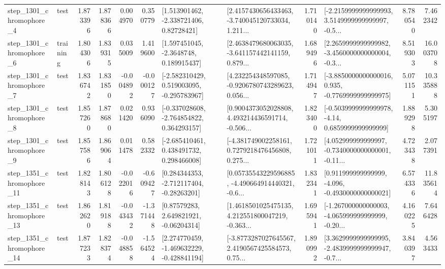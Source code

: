 \begin{tabular}{llrrrrllrlrr}
  step\_1301\_chromophore\_4 &      test &      1.873396 &    1.878366 &      0.004970 &  0.350779 &     [1.513901462, -2.338721406, 0.82728421] &  [2.4157430656433463, -3.740045120733034, 1.211... &       1.710140 &  [-2.2159999999999993, 3.5149999999999997, -0.5... &            8.780540 &          7.462342 \\
  step\_1301\_chromophore\_6 &  training &      1.804306 &    1.839315 &      0.035009 &  1.419600 &      [1.597451045, -2.3648748, 0.189915437] &  [2.4638479680063035, -3.641157442141159, 0.879... &       1.689496 &  [2.2659999999999982, -3.4560000000000004, -0.3... &            8.519303 &         16.003708 \\
  step\_1301\_chromophore\_7 &      test &      1.836742 &    1.831850 &     -0.004892 & -0.000127 &   [-2.582310429, 0.519003095, -0.295783967] &  [4.232254348597085, -0.9206780743289623, 0.056... &       1.714947 &  [-3.8850000000000016, 0.935, -0.7769999999999975] &            5.071151 &         10.335888 \\
  step\_1301\_chromophore\_8 &      test &      1.857260 &    1.878680 &      0.021420 &  0.936090 &   [-0.337028608, -2.764854822, 0.364293157] &  [0.9004373052028808, 4.493214436591714, -0.506... &       1.823400 &   [-0.5039999999999978, -4.14, 0.6859999999999999] &            1.889298 &          5.305197 \\
  step\_1301\_chromophore\_9 &      test &      1.857586 &    1.869064 &      0.011478 &  0.582332 &    [-2.685410461, 0.438491732, 0.298466008] &  [-4.381749002258161, 0.7279218476456808, 0.275... &       1.721011 &  [4.052999999999997, -0.7340000000000001, -0.11... &            4.723438 &          2.077391 \\
 step\_1351\_chromophore\_11 &      test &      1.828143 &    1.806128 &     -0.022016 & -0.609427 &    [0.284344353, -2.712117404, -0.28263201] &  [0.05735543229596885, -4.490664914440321, -0.6... &       1.832341 &   [0.911999999999999, -4.096, -0.4930000000000021] &            6.574336 &         11.835614 \\
 step\_1351\_chromophore\_13 &      test &      1.862620 &    1.819188 &     -0.043432 & -1.371448 &      [0.87579283, 2.649821921, -0.06204314] &  [1.4618501025475135, 4.212551800047219, -0.363... &       1.695941 &  [-1.267000000000003, -4.065999999999999, -0.20... &            4.160225 &          7.646428 \\
 step\_1351\_chromophore\_14 &      test &      1.877233 &    1.828374 &     -0.048858 & -1.564524 &   [2.274770459, -1.469632229, -0.428841194] &  [-3.8773287027645567, 2.4190567425584573, 0.75... &       1.890992 &  [3.3629999999999995, -2.4839999999999947, -0.7... &            3.840397 &          4.563433 \\

\end{tabular}
